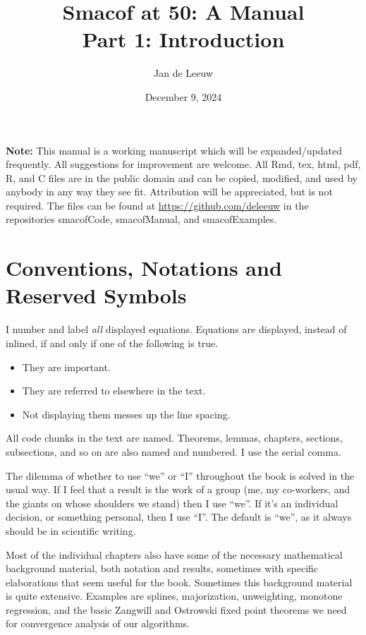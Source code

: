 \documentclass[
  12pt,
  letterpaper,
  DIV=11,
  numbers=noendperiod]{scrartcl}
\title{Smacof at 50: A Manual\\
Part 1: Introduction}
\author{Jan de Leeuw}
\date{December 9, 2024}
\providecommand{\tightlist}{%
  \setlength{\itemsep}{0pt}\setlength{\parskip}{0pt}}\usepackage{longtable,booktabs,array}
\newcommand{\sectionbreak}{\clearpage}
\renewcommand*\contentsname{Table of contents}
\newcommand\contentsname{Table of contents}
\begin{document}
\maketitle

\renewcommand*\contentsname{Table of contents}
{
\hypersetup{linkcolor=}
\setcounter{tocdepth}{3}
\tableofcontents
}

\sectionbreak

\textbf{Note:} This manual is a working manuscript which will be
expanded/updated frequently. All suggestions for improvement are
welcome. All Rmd, tex, html, pdf, R, and C files are in the public
domain and can be copied, modified, and used by anybody in any way they
see fit. Attribution will be appreciated, but is not required. The files
can be found at \url{https://github.com/deleeuw} in the repositories
smacofCode, smacofManual, and smacofExamples.

\sectionbreak

\section*{Conventions, Notations and Reserved
Symbols}\label{conventions-notations-and-reserved-symbols}

I number and label \emph{all} displayed equations. Equations are
displayed, instead of inlined, if and only if one of the following is
true.

\begin{itemize}
\tightlist
\item
  They are important.
\item
  They are referred to elsewhere in the text.
\item
  Not displaying them messes up the line spacing.
\end{itemize}

All code chunks in the text are named. Theorems, lemmas, chapters,
sections, subsections, and so on are also named and numbered. I use the
serial comma.

The dilemma of whether to use ``we'' or ``I'' throughout the book is
solved in the usual way. If I feel that a result is the work of a group
(me, my co-workers, and the giants on whose shoulders we stand) then I
use ``we''. If it's an individual decision, or something personal, then
I use ``I''. The default is ``we'', as it always should be in scientific
writing.

Most of the individual chapters also have some of the necessary
mathematical background material, both notation and results, sometimes
with specific elaborations that seem useful for the book. Sometimes this
background material is quite extensive. Examples are splines,
majorization, unweighting, monotone regression, and the basic Zangwill
and Ostrowski fixed point theorems we need for convergence analysis of
our algorithms.
\end{document}
